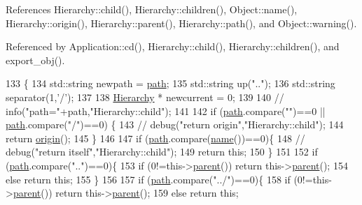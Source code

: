 References Hierarchy\+::child(), Hierarchy\+::children(), Object\+::name(), Hierarchy\+::origin(), Hierarchy\+::parent(), Hierarchy\+::path(), and Object\+::warning().



Referenced by Application\+::cd(), Hierarchy\+::child(), Hierarchy\+::children(), and export\+\_\+obj().


\begin{DoxyCode}
133                                          \{
134   std::string newpath = \hyperlink{classHierarchy_aa7990fa7caf132d83e361ce033c6c65a}{path};
135   std::string up(\textcolor{stringliteral}{".."});
136   std::string separator(1,\textcolor{charliteral}{'/'});
137 
138   \hyperlink{classHierarchy}{Hierarchy} * newcurrent = 0;
139 
140   \textcolor{comment}{//  info("path="+path,"Hierarchy::child");}
141 
142   \textcolor{keywordflow}{if} (\hyperlink{classHierarchy_aa7990fa7caf132d83e361ce033c6c65a}{path}.compare(\textcolor{stringliteral}{""})==0 || \hyperlink{classHierarchy_aa7990fa7caf132d83e361ce033c6c65a}{path}.compare(\textcolor{stringliteral}{"/"})==0) \{
143     \textcolor{comment}{//    debug("return origin","Hierarchy::child");}
144     \textcolor{keywordflow}{return} \hyperlink{classHierarchy_aee461dc930ce3871636ff87f075b1b83}{origin}();
145   \}
146 
147   \textcolor{keywordflow}{if} (\hyperlink{classHierarchy_aa7990fa7caf132d83e361ce033c6c65a}{path}.compare(\hyperlink{classObject_a300f4c05dd468c7bb8b3c968868443c1}{name}())==0)\{
148     \textcolor{comment}{//    debug("return itself","Hierarchy::child");}
149     \textcolor{keywordflow}{return} \textcolor{keyword}{this};
150   \}
151 
152   \textcolor{keywordflow}{if} (\hyperlink{classHierarchy_aa7990fa7caf132d83e361ce033c6c65a}{path}.compare(\textcolor{stringliteral}{".."})==0)\{
153     \textcolor{keywordflow}{if} (0!=this->\hyperlink{classHierarchy_a1c7bec8257e717f9c1465e06ebf845fc}{parent}()) \textcolor{keywordflow}{return} this->\hyperlink{classHierarchy_a1c7bec8257e717f9c1465e06ebf845fc}{parent}();
154     \textcolor{keywordflow}{else} \textcolor{keywordflow}{return} \textcolor{keyword}{this};
155   \}
156 
157   \textcolor{keywordflow}{if} (\hyperlink{classHierarchy_aa7990fa7caf132d83e361ce033c6c65a}{path}.compare(\textcolor{stringliteral}{"../"})==0)\{
158     \textcolor{keywordflow}{if} (0!=this->\hyperlink{classHierarchy_a1c7bec8257e717f9c1465e06ebf845fc}{parent}()) \textcolor{keywordflow}{return} this->\hyperlink{classHierarchy_a1c7bec8257e717f9c1465e06ebf845fc}{parent}();
159     \textcolor{keywordflow}{else} \textcolor{keywordflow}{return} \textcolor{keyword}{this};

\end{DoxyCode}
